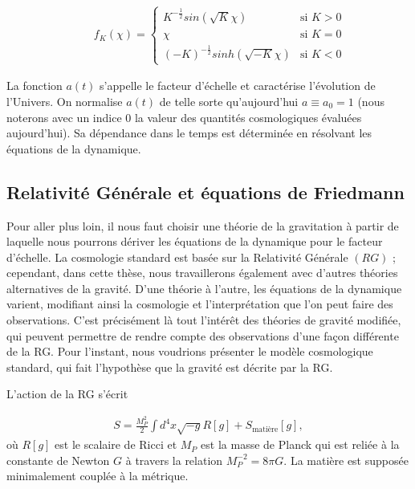 \documentclass[a4paper,12pt]{report}
\theoremstyle{plain}
\theoremstyle{plain}
\begin{document}
   \begin{eqnarray}
   \qquad
   f_K(\chi) =  \begin{cases}
   K^{- \frac{1}{2}} sin( \sqrt{ K} \chi )  &\text{si }  K > 0 \\    \chi &\text{si } K = 0 \\ (-K)^{- \frac{1}{2}} sinh( \sqrt{ -K} \chi )
   &\text{si } K < 0
\end{cases}
    \end{eqnarray}

    La fonction $a(t)$ s'appelle le facteur d'\'echelle et caract\'erise l'\'evolution de l'Univers. On
normalise $ a(t) $ de telle sorte qu'aujourd'hui $ a \equiv a_0 = 1 $ (nous noterons avec un indice 0
la valeur des quantit\'es cosmologiques \'evalu\'ees aujourd'hui). Sa d\'ependance dans le temps
est d\'etermin\'ee en r\'esolvant les \'equations de la dynamique.

\subsection{Relativit\'e G\'en\'erale et \'equations de Friedmann}
Pour aller plus loin, il nous faut choisir une th\'eorie de la gravitation \`a partir de 
laquelle nous pourrons d\'eriver les \'equations de la dynamique pour le facteur d'\'echelle. La
cosmologie standard est bas\'ee sur la Relativit\'e G\'en\'erale $(RG)$ ; cependant, dans
cette th\`ese, nous travaillerons \'egalement avec d'autres th\'eories alternatives de la gravit\'e.
D'une th\'eorie \`a l'autre, les
\'equations de la dynamique varient, modifiant ainsi la cosmologie et l'interpr\'etation que
l'on peut faire des observations. C'est pr\'ecis\'ement l\`a tout l'int\'er\^et des th\'eories de gravit\'e
modifi\'ee, qui peuvent permettre de rendre compte des observations d'une fa\c{c}on diff\'erente
de la RG. Pour l'instant, nous voudrions
pr\'esenter le mod\`ele cosmologique standard, qui fait l'hypoth\`ese que la gravit\'e est d\'ecrite
par la RG.

L'action de la RG s'\'ecrit

\begin{eqnarray}
 S = \frac{M_P^2}{2} \int d^4 x \sqrt{- g} R [g]  + S_{\text {mati\`ere} } [ g],
\end{eqnarray}
o\`u $ R[g]$ est le scalaire de Ricci et $ M_P $ est la masse de Planck qui est reli\'ee \`a la constante de
Newton $G$ \`a travers  la relation $ M_P^{ -2} = 8 \pi G $. La mati\`ere est suppos\'ee minimalement
coupl\'ee \`a la m\'etrique.
\end{document}
